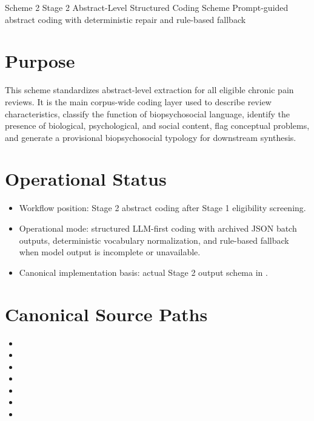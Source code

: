 \documentclass[11pt]{article}
\begin{document}
\schemeheader
  {Scheme 2}
  {Stage 2 Abstract-Level Structured Coding Scheme}
  {Prompt-guided abstract coding with deterministic repair and rule-based fallback}

\section*{Purpose}
This scheme standardizes abstract-level extraction for all eligible chronic pain reviews. It is the main corpus-wide coding layer used to describe review characteristics, classify the function of biopsychosocial language, identify the presence of biological, psychological, and social content, flag conceptual problems, and generate a provisional biopsychosocial typology for downstream synthesis.

\section*{Operational Status}
\begin{itemize}
\item Workflow position: Stage 2 abstract coding after Stage 1 eligibility screening.
\item Operational mode: structured LLM-first coding with archived JSON batch outputs, deterministic vocabulary normalization, and rule-based fallback when model output is incomplete or unavailable.
\item Canonical implementation basis: actual Stage 2 output schema in .
\end{itemize}

\section*{Canonical Source Paths}
\begin{itemize}
\item {}
\item {}
\item {}
\item {}
\item {}
\item {}
\item {}
\end{itemize}
\end{document}
